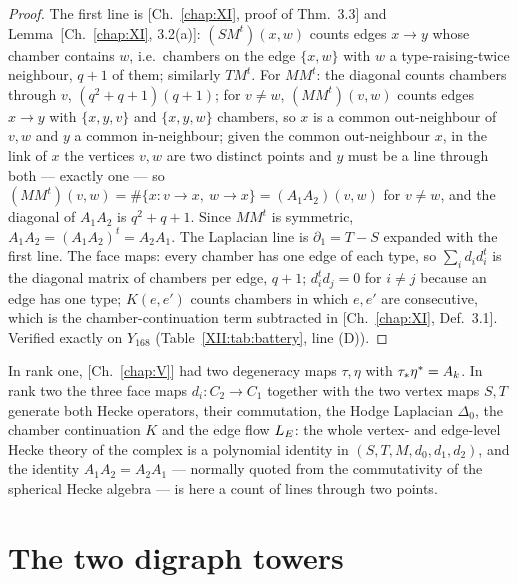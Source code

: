 \begin{proof}
The first line is [Ch.~\ref{chap:XI}, proof of Thm.~3.3] and Lemma~[Ch.~\ref{chap:XI}, 3.2(a)]: $(SM^{t})(x,w)$ counts
edges $x\to y$ whose chamber contains $w$, i.e.\ chambers on the edge $\{x,w\}$ with $w$ a
type-raising-twice neighbour, $q+1$ of them; similarly $TM^{t}$. For $MM^{t}$: the diagonal
counts chambers through $v$, $(q^{2}+q+1)(q+1)$; for $v\ne w$, $(MM^{t})(v,w)$ counts edges
$x\to y$ with $\{x,y,v\}$ and $\{x,y,w\}$ chambers, so $x$ is a common out-neighbour of $v,w$
and $y$ a common in-neighbour; given the common out-neighbour $x$, in the link of $x$ the
vertices $v,w$ are two distinct points and $y$ must be a line through both --- exactly one
--- so $(MM^{t})(v,w)=\#\{x\colon v\to x,\ w\to x\}=(A_1A_2)(v,w)$ for $v\ne w$, and the
diagonal of $A_1A_2$ is $q^{2}+q+1$. Since $MM^{t}$ is symmetric, $A_1A_2=(A_1A_2)^{t}=A_2A_1$.
The Laplacian line is $\partial_1=T-S$ expanded with the first line. The face maps: every
chamber has one edge of each type, so $\sum_id_id_i^{t}$ is the diagonal matrix of chambers
per edge, $q+1$; $d_i^{t}d_j=0$ for $i\ne j$ because an edge has one type; $K(e,e')$ counts
chambers in which $e,e'$ are consecutive, which is the chamber-continuation term subtracted
in [Ch.~\ref{chap:XI}, Def.~3.1]. Verified exactly on $Y_{168}$ (Table~\ref{XII:tab:battery}, line (D)).
\end{proof}

\begin{remark}\label{XII:rem:degeneracy}
In rank one, [Ch.~\ref{chap:V}] had two degeneracy maps $\tau,\eta$ with $\tau_*\eta^*=A_k$. In rank two the
three face maps $d_i\colon C_2\to C_1$ together with the two vertex maps $S,T$ generate
both Hecke operators, their commutation, the Hodge Laplacian $\Delta_0$, the chamber
continuation $K$ and the edge flow $L_E$: the whole vertex- and edge-level Hecke theory of
the complex is a polynomial identity in $(S,T,M,d_0,d_1,d_2)$, and the identity
$A_1A_2=A_2A_1$ --- normally quoted from the commutativity of the spherical Hecke algebra
--- is here a count of lines through two points.
\end{remark}

\section{The two digraph towers}\label{XII:sec:towers}

